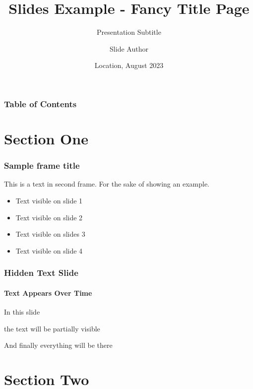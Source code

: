 \documentclass{beamer}
\title[Slides Example - Fancy Title Page] %
{Slides Example - Fancy Title Page}
\subtitle{Presentation Subtitle}
\author[Author, Slide] %
{Slide Author\inst{1}}
\institute[Institutional Affiliation] %
{
  \inst{1}%
  Institutional Affiliation
}
\date[2023.08] %
{Location, August 2023}
\begin{document}
\frame[b,nittanytitle]{\titlepage}

\begin{frame}
\frametitle{Table of Contents}
\tableofcontents
\end{frame}


\section{Section One}

\begin{frame}
\frametitle{Sample frame title}


This is a text in second frame. For the sake of showing an example.




\begin{itemize}
    \item<1-> Text visible on slide 1
    \item<2-> Text visible on slide 2
    \item<3> Text visible on slides 3
    \item<4-> Text visible on slide 4
\end{itemize}
\end{frame}



\begin{frame}
\frametitle{Hidden Text Slide}
\framesubtitle{Text Appears Over Time}
In this slide \pause

the text will be partially visible \pause

And finally everything will be there
\end{frame}

\section{Section Two}
\end{document}
